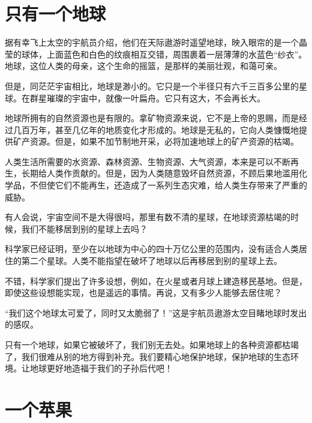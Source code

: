 \documentclass[12pt,UTF-8,openany]{ctexbook}
\begin{document}
\chapter{只有一个地球}

\begin{large}
    
    据有幸飞上太空的宇航员介绍，他们在天际遨游时遥望地球，映入眼帘的是一个晶莹的球体，上面蓝色和白色的纹痕相互交错，周围裹着一层薄薄的水蓝色“纱衣”。地球，这位人类的母亲，这个生命的摇篮，是那样的美丽壮观，和蔼可亲。
    
    但是，同茫茫宇宙相比，地球是渺小的。它只是一个半径只有六千三百多公里的星球。在群星璀璨的宇宙中，就像一叶扁舟。它只有这大，不会再长大。
    
    地球所拥有的自然资源也是有限的。拿矿物资源来说，它不是上帝的恩赐，而是经过几百万年，甚至几亿年的地质变化才形成的。地球是无私的，它向人类慷慨地提供矿产资源。但是，如果不加节制地开采，必将加速地球上的矿产资源的枯竭。
    
    人类生活所需要的水资源、森林资源、生物资源、大气资源，本来是可以不断再生，长期给人类作贡献的。但是，因为人类随意毁坏自然资源，不顾后果地滥用化学品，不但使它们不能再生，还造成了一系列生态灾难，给人类生存带来了严重的威胁。
    
    有人会说，宇宙空间不是大得很吗，那里有数不清的星球，在地球资源枯竭的时候，我们不能移居到别的星球上去吗？
    
    科学家已经证明，至少在以地球为中心的四十万亿公里的范围内，没有适合人类居住的第二个星球。人类不能指望在破坏了地球以后再移居到别的星球上去。
    
    不错，科学家们提出了许多设想，例如，在火星或者月球上建造移民基地。但是，即使这些设想能实现，也是遥远的事情。再说，又有多少人能够去居住呢？
    
    “我们这个地球太可爱了，同时又太脆弱了！”这是宇航员遨游太空目睹地球时发出的感叹。
    
    只有一个地球，如果它被破坏了，我们别无去处。如果地球上的各种资源都枯竭了，我们很难从别的地方得到补充。我们要精心地保护地球，保护地球的生态环境。让地球更好地造福于我们的子孙后代吧！
    
\end{large}



\chapter{一个苹果}
\end{document}
